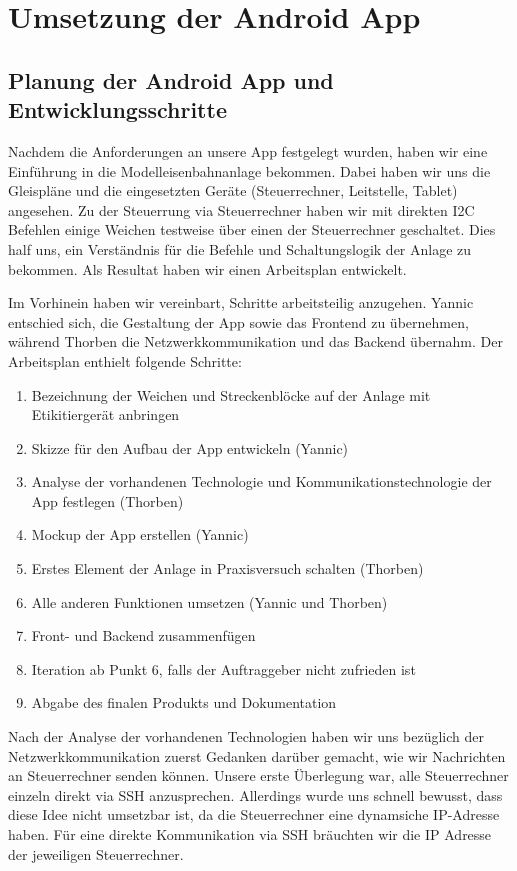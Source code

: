 \documentclass{article}
\begin{document}
\section{Umsetzung der Android App}

\subsection{Planung der Android App und Entwicklungsschritte}
Nachdem die Anforderungen an unsere App festgelegt wurden, haben wir eine Einführung in die Modelleisenbahnanlage bekommen. 
Dabei haben wir uns die Gleispläne und die eingesetzten Geräte (Steuerrechner, Leitstelle, Tablet) angesehen.
Zu der Steuerrung via Steuerrechner haben wir mit direkten I2C Befehlen einige Weichen testweise über einen der Steuerrechner geschaltet.
Dies half uns, ein Verständnis für die Befehle und Schaltungslogik der Anlage zu bekommen.
Als Resultat haben wir einen Arbeitsplan entwickelt.

Im Vorhinein haben wir vereinbart, Schritte arbeitsteilig anzugehen.
Yannic entschied sich, die Gestaltung der App sowie das Frontend zu übernehmen, während Thorben die Netzwerkkommunikation und das Backend übernahm.
Der Arbeitsplan enthielt folgende Schritte:
\begin{enumerate}
    \item Bezeichnung der Weichen und Streckenblöcke auf der Anlage mit Etikitiergerät anbringen
    \item Skizze für den Aufbau der App entwickeln (Yannic)
    \item Analyse der vorhandenen Technologie und Kommunikationstechnologie der App festlegen (Thorben)
    \item Mockup der App erstellen (Yannic)
    \item Erstes Element der Anlage in Praxisversuch schalten (Thorben)
    \item Alle anderen Funktionen umsetzen (Yannic und Thorben)
    \item Front- und Backend zusammenfügen
    \item Iteration ab Punkt 6, falls der Auftraggeber nicht zufrieden ist
    \item Abgabe des finalen Produkts und Dokumentation
\end{enumerate}

Nach der Analyse der vorhandenen Technologien haben wir uns bezüglich der Netzwerkkommunikation zuerst Gedanken darüber gemacht, wie wir Nachrichten an Steuerrechner senden können.
Unsere erste Überlegung war, alle Steuerrechner einzeln direkt via SSH anzusprechen.
Allerdings wurde uns schnell bewusst, dass diese Idee nicht umsetzbar ist, da die Steuerrechner eine dynamsiche IP-Adresse haben.
Für eine direkte Kommunikation via SSH bräuchten wir die IP Adresse der jeweiligen Steuerrechner.
\end{document}
